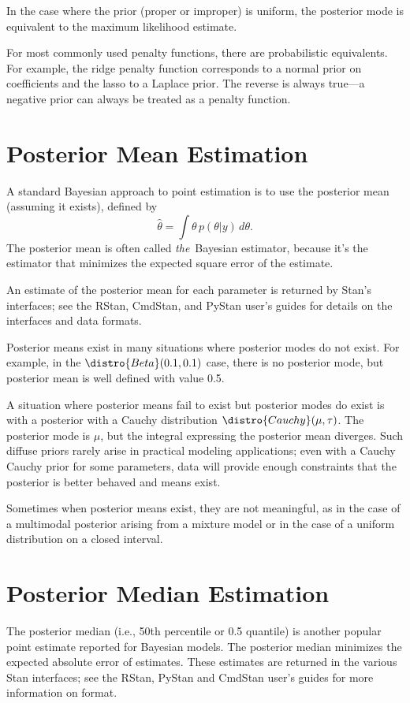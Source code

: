 In the case where the prior (proper or improper) is uniform, the
posterior mode is equivalent to the maximum likelihood estimate.

For most commonly used penalty functions, there are probabilistic
equivalents.  For example, the ridge penalty function corresponds to a
normal prior on coefficients and the lasso to a Laplace prior.  The
reverse is always true---a negative prior can always be treated as a
penalty function.



\section{Posterior Mean Estimation}

A standard Bayesian approach to point estimation is to use the
posterior mean (assuming it exists), defined by
%
\[
\hat{\theta} = \int \theta \, p(\theta|y) \, d\theta.
\]
%
The posterior mean is often called {\it the}\ Bayesian estimator,
because it's the estimator that minimizes the expected square error of
the estimate.

An estimate of the posterior mean for each parameter is returned by
Stan's interfaces;  see the RStan, CmdStan, and PyStan user's guides
for details on the interfaces and data formats.

Posterior means exist in many situations where posterior
modes do not exist.  For example, in the $\distro{Beta}(0.1, 0.1)$
case, there is no posterior mode, but posterior mean is well defined
with value 0.5.

A situation where posterior means fail to exist but posterior modes do
exist is with a posterior with a Cauchy distribution
$\distro{Cauchy}(\mu,\tau)$.  The posterior mode is $\mu$, but the
integral expressing the posterior mean diverges.  Such diffuse priors
rarely arise in practical modeling applications; even with a Cauchy
Cauchy prior for some parameters, data will provide enough constraints
that the posterior is better behaved and means exist.

Sometimes when posterior means exist, they are not meaningful, as in
the case of a multimodal posterior arising from a mixture model or in
the case of a uniform distribution on a closed interval.


\section{Posterior Median Estimation}

The posterior median (i.e., 50th percentile or 0.5 quantile) is
another popular point estimate reported for Bayesian models.  The
posterior median minimizes the expected absolute error of estimates.
These estimates are returned in the various Stan interfaces;  see the
RStan, PyStan and CmdStan user's guides for more information on
format.

